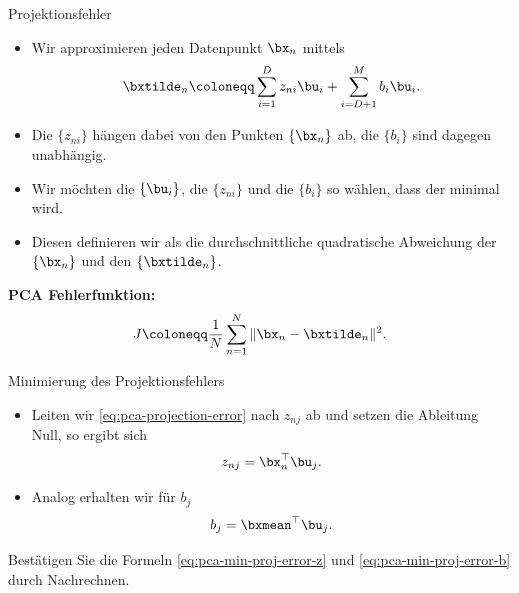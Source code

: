 \begin{frame}{Projektionsfehler}{}
	\begin{itemize}
		\item Wir approximieren jeden Datenpunkt $\bx_n$ mittels
		\begin{equation} \label{eq:pca-approximation-data-point}
			\bxtilde_n \coloneqq \sum_{i=1}^D z_{ni} \bu_i + \sum_{i=D+1}^M b_i \bu_i.
		\end{equation}
		\item Die $\{ z_{ni} \}$ hängen dabei von den Punkten $\{ \bx_n \}$ ab, die $\{ b_i \}$ sind dagegen unabhängig.
		\item Wir möchten die $\{ \bu_i \}$, die $\{ z_{ni} \}$ und die $\{ b_i \}$ so wählen, dass der  minimal wird.
		\item Diesen definieren wir als die durchschnittliche quadratische Abweichung der $\{ \bx_n \}$ und den $\{ \bxtilde_n \}$.
	\end{itemize}
	
	\begin{boxGray}
		\textbf{PCA Fehlerfunktion:}
		\begin{equation} \label{eq:pca-projection-error}
			J \coloneqq \frac{1}{N} \sum_{n=1}^N \Vert \bx_n - \bxtilde_n \Vert^2.
		\end{equation}
	\end{boxGray}
\end{frame}


\begin{frame}{Minimierung des Projektionsfehlers}{}
	\begin{itemize}
		\item Leiten wir \eqref{eq:pca-projection-error} nach $z_{nj}$ ab und setzen die Ableitung Null, so ergibt sich
		\begin{equation} \label{eq:pca-min-proj-error-z}
			z_{nj} = \bx_n^\top \bu_j.
		\end{equation}
		\item Analog erhalten wir für $b_j$
		\begin{equation} \label{eq:pca-min-proj-error-b}
			b_j = \bxmean^\top \bu_j.
		\end{equation}
	\end{itemize}

	\begin{mytask}
		Bestätigen Sie die Formeln \eqref{eq:pca-min-proj-error-z} und \eqref{eq:pca-min-proj-error-b} durch Nachrechnen.
	\end{mytask}
\end{frame}


